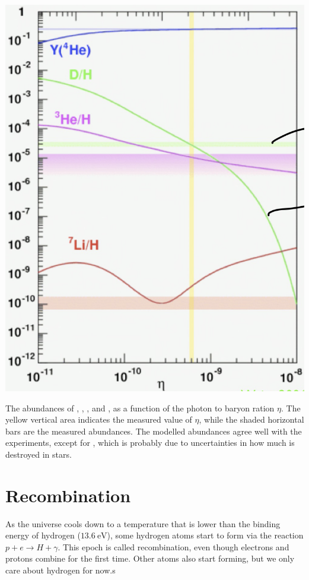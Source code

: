 \begin{marginfigure}
	\centering
	\includegraphics[width=\textwidth]{img/ch-02/nucleosynthesis.png}
	\caption{The abundances of , , , and , as a function of the photon to baryon ration $\eta$. The yellow vertical area indicates the measured value of $\eta$, while the shaded horizontal bars are the measured abundances. The modelled abundances agree well with the experiments, except for , which is probably due to uncertainties in how much  is destroyed in stars.}
	\label{fig:nucleosynthesis}
\end{marginfigure}


\section{Recombination}

As the universe cools down to a temperature that is lower than the binding energy of hydrogen ($\SI{13.6}{\eV}$), some hydrogen atoms start to form via the reaction $p + e \to H + \gamma$. This epoch is called recombination, even though electrons and protons combine for the first time. Other atoms also start forming, but we only care about hydrogen for now.s


